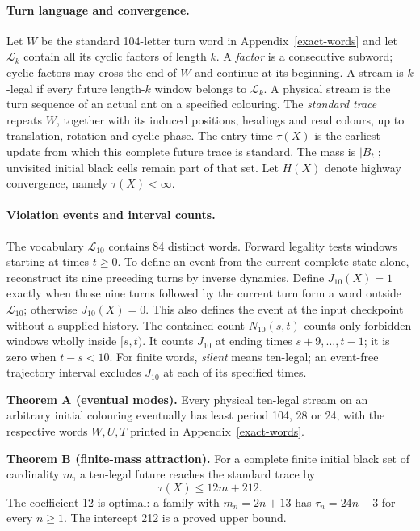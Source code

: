\documentclass[
  11pt,
]{article}
\begin{document}
\paragraph*{Turn language and convergence.}
Let \(W\) be the standard 104-letter turn word
in Appendix~\ref{exact-words} and let \(\mathcal L_k\) contain all its cyclic factors
of length \(k\). A \emph{factor} is a consecutive subword; cyclic factors
may cross the end of $W$ and continue at its beginning. A stream is
\(k\)-legal if every future length-\(k\) window belongs to
\(\mathcal L_k\). A physical stream is the turn sequence of an actual ant
on a specified colouring. The \emph{standard trace} repeats $W$, together
with its induced positions, headings and read colours, up to translation,
rotation and cyclic phase. The entry time $\tau(X)$ is the earliest update
from which this complete future trace is standard. The mass is $|B_t|$;
unvisited initial black cells remain part of that set. Let $H(X)$ denote
highway convergence, namely $\tau(X)<\infty$.

\paragraph*{Violation events and interval counts.}
The vocabulary $\mathcal L_{10}$ contains 84 distinct words. Forward legality
tests windows starting at times $t\ge0$. To define an event from the current
complete state alone, reconstruct its nine preceding turns by inverse dynamics.
Define $J_{10}(X)=1$ exactly when those nine turns followed by the current turn
form a word outside $\mathcal L_{10}$; otherwise $J_{10}(X)=0$.
This also defines the event at the input checkpoint without a supplied history.
The contained count $N_{10}(s,t)$ counts only forbidden windows wholly inside
$[s,t)$. It counts $J_{10}$ at ending times $s+9,\ldots,t-1$; it is zero when
$t-s<10$. For finite words, \emph{silent} means ten-legal; an event-free
trajectory interval excludes $J_{10}$ at each of its specified times.

\textbf{Theorem A (eventual modes).} Every physical ten-legal stream on
an arbitrary initial colouring eventually has least period 104, 28 or
24, with the respective words \(W,U,T\) printed in Appendix~\ref{exact-words}.

\textbf{Theorem B (finite-mass attraction).} For a complete finite
initial black set of cardinality \(m\), a ten-legal future reaches the
standard trace by \[\tau(X)\le 12m+212.\] The coefficient 12 is optimal:
a family with \(m_n=2n+13\) has \(\tau_n=24n-3\) for every \(n\ge1\).
The intercept 212 is a proved upper bound.
\end{document}

